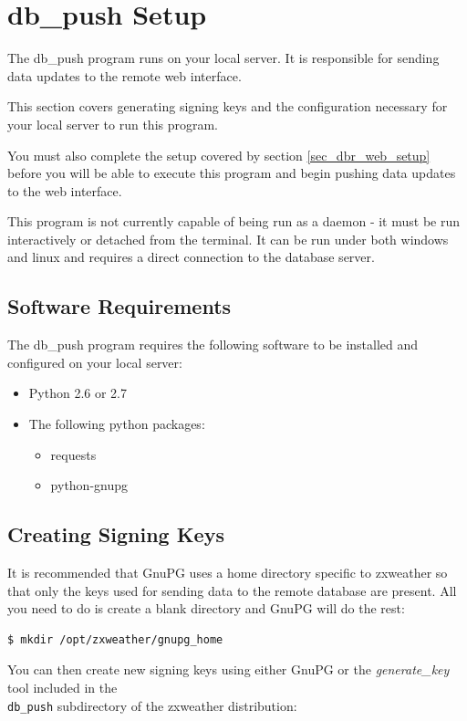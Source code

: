 \documentclass[a4paper,10pt,draft]{book}
\begin{document}
\section{db\_push Setup}
The db\_push program runs on your local server. It is responsible for sending data updates to the remote web interface. 

This section covers generating signing keys and the configuration necessary for your local server to run this program.

You must also complete the setup covered by section \ref{sec_dbr_web_setup} before you will be able to execute this program and begin pushing data updates to the web interface.

This program is not currently capable of being run as a daemon - it must be run interactively or detached from the terminal. It can be run under both windows and linux and requires a direct connection to the database server.

\subsection{Software Requirements}
The db\_push program requires the following software to be installed and configured on your local server:
\begin{itemize}
\item Python 2.6 or 2.7
\item The following python packages:
\begin{itemize}
\item requests
\item python-gnupg
\end{itemize}
\end{itemize}

\subsection{Creating Signing Keys}
\label{subsec_dbr_create_keys}

It is recommended that GnuPG uses a home directory specific to zxweather so that only the keys used for sending data to the remote database are present. All you need to do is create a blank directory and GnuPG will do the rest:

\begin{verbatim}
$ mkdir /opt/zxweather/gnupg_home
\end{verbatim}

You can then create new signing keys using either GnuPG or the \emph{generate\_key} tool included in the \\ \verb|db_push| subdirectory of the zxweather distribution:
\end{document}
